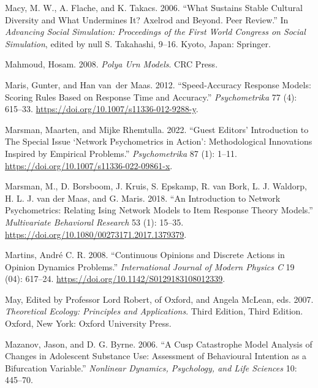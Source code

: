 \documentclass[
  a4paper,
  DIV=11,
  numbers=noendperiod,
  oneside]{scrreprt}
\newlength{\cslhangindent}
\newlength{\cslentryspacingunit} %
\newenvironment{CSLReferences}[2] %
 {%
  \setlength{\parindent}{0pt}
  \ifodd #1
  \let\oldpar\par
  \def\par{\hangindent=\cslhangindent\oldpar}
  \fi
  \setlength{\parskip}{#2\cslentryspacingunit}
 }%
 {}
\begin{document}
\begin{CSLReferences}{1}{0}
\leavevmode{}%
Macy, M. W., A. Flache, and K. Takacs. 2006. {``What {Sustains Stable
Cultural Diversity} and {What Undermines It}? {Axelrod} and Beyond.
{Peer} Review.''} In \emph{Advancing {Social Simulation}: {Proceedings}
of the {First World Congress} on {Social Simulation}}, edited by null S.
Takahashi, 9--16. {Kyoto, Japan}: {Springer}.

\leavevmode{}%
Mahmoud, Hosam. 2008. \emph{Polya {Urn Models}}. {CRC Press}.

\leavevmode{}%
Maris, Gunter, and Han van~der Maas. 2012. {``Speed-Accuracy Response
Models: {Scoring} Rules Based on Response Time and Accuracy.''}
\emph{Psychometrika} 77 (4): 615--33.
\url{https://doi.org/10.1007/s11336-012-9288-y}.

\leavevmode{}%
Marsman, Maarten, and Mijke Rhemtulla. 2022. {``Guest {Editors}'
{Introduction} to {The Special Issue} {`{Network Psychometrics} in
{Action}'}: {Methodological Innovations Inspired} by {Empirical
Problems}.''} \emph{Psychometrika} 87 (1): 1--11.
\url{https://doi.org/10.1007/s11336-022-09861-x}.

\leavevmode{}%
Marsman, M., D. Borsboom, J. Kruis, S. Epskamp, R. van Bork, L. J.
Waldorp, H. L. J. van der Maas, and G. Maris. 2018. {``An Introduction
to Network Psychometrics: Relating Ising Network Models to Item Response
Theory Models.''} \emph{Multivariate Behavioral Research} 53 (1):
15--35. \url{https://doi.org/10.1080/00273171.2017.1379379}.

\leavevmode{}%
Martins, André C. R. 2008. {``Continuous Opinions and Discrete Actions
in Opinion Dynamics Problems.''} \emph{International Journal of Modern
Physics C} 19 (04): 617--24.
\url{https://doi.org/10.1142/S0129183108012339}.

\leavevmode{}%
May, Edited by Professor Lord Robert, of Oxford, and Angela McLean, eds.
2007. \emph{Theoretical {Ecology}: {Principles} and {Applications}}.
Third Edition, Third Edition. {Oxford, New York}: {Oxford University
Press}.

\leavevmode{}%
Mazanov, Jason, and D. G. Byrne. 2006. {``A {Cusp Catastrophe Model
Analysis} of {Changes} in {Adolescent Substance Use}: {Assessment} of
{Behavioural Intention} as a {Bifurcation Variable}.''} \emph{Nonlinear
Dynamics, Psychology, and Life Sciences} 10: 445--70.


\end{CSLReferences}
\end{document}
